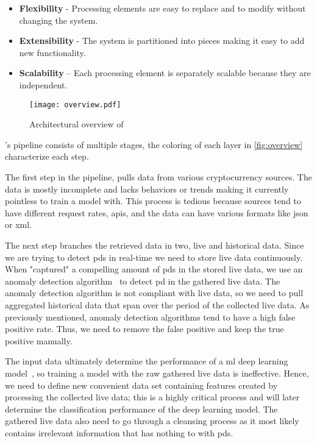 \begin{itemize}
    \item \textbf{Flexibility} - Processing elements are easy to replace and to modify without changing the system.
    \item \textbf{Extensibility} - The system is partitioned into pieces making it easy to add new functionality.
    \item \textbf{Scalability} – Each processing element is separately scalable because they are independent.
\end{itemize}

\begin{figure}[ht]
    \centering
    \texttt{[image: overview.pdf]}
    \caption{Architectural overview of \project}
    \label{fig:overview}
\end{figure}

\project's pipeline consists of multiple stages, the coloring of each layer in \autoref{fig:overview} characterize each step.

The first step in the pipeline, pulls data from various cryptocurrency sources. The data is mostly incomplete and lacks behaviors or trends making it currently pointless to train a model with. This process is tedious because sources tend to have different request rates, \acp{api}, and the data can have various formats like \ac{json} or \ac{xml}.

The next step branches the retrieved data in two, live and historical data. Since we are trying to detect \acp{pd} in real-time we need to store live data continuously. When "captured" a compelling amount of \acp{pd} in the stored live data, we use an anomaly detection algorithm~\cite{P&D_to_the_moon} to detect \ac{pd} in the gathered live data. The anomaly detection algorithm is not compliant with live data, so we need to pull aggregated historical data that span over the period of the collected live data. As previously mentioned, anomaly detection algorithms tend to have a high false positive rate. Thus, we need to remove the false positive and keep the true positive manually.

The input data ultimately determine the performance of a \ac{ml} deep learning model~\cite{mike_voets}, so training a model with the raw gathered live data is ineffective. Hence, we need to define new convenient data set containing features created by processing the collected live data; this is a highly critical process and will later determine the classification performance of the deep learning model. The gathered live data also need to go through a cleansing process as it most likely contains irrelevant information that has nothing to with \acp{pd}.


